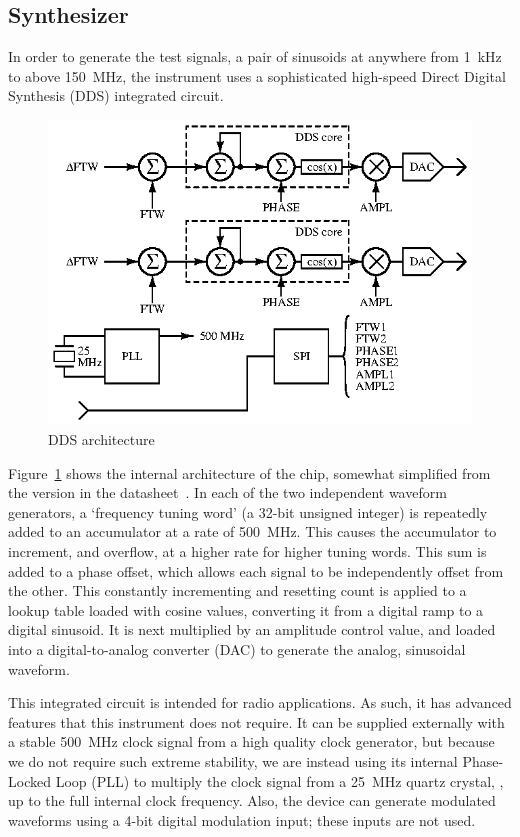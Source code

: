 \subsection{Synthesizer}


In order to generate the test signals, a pair of sinusoids at anywhere from
1~kHz to above 150~MHz, the instrument uses a sophisticated
high-speed Direct Digital Synthesis (DDS) integrated circuit.

\begin{figure}[H]
\centering
\includegraphics{too/dds}
\caption{DDS architecture}
\label{fig:dds}
\end{figure}

Figure~\ref{fig:dds} shows the internal architecture of the chip, somewhat
simplified from the version in the datasheet~\cite{ad9958}. In each of the two
independent waveform generators, a `frequency tuning word' (a 32-bit unsigned
integer) is repeatedly added to an accumulator at a rate of 500~MHz.
This causes the accumulator to increment, and overflow, at a higher rate for
higher tuning words. This sum is added to a phase offset, which allows each
signal to be independently offset from the other. This constantly incrementing
and resetting count is applied to a lookup table loaded with cosine values,
converting it from a digital ramp to a digital sinusoid. It is next multiplied
by an amplitude control value, and loaded into a digital-to-analog converter
(DAC) to generate the analog, sinusoidal waveform.

This integrated circuit is intended for radio applications. As such, it has
advanced features that this instrument does not require. It can be supplied
externally with a stable 500~MHz clock signal from a high quality
clock generator, but because we do not require such extreme stability, we
are instead using its internal Phase-Locked Loop (PLL) to multiply the clock
signal from a 25~MHz quartz crystal, , up to the full
internal clock frequency. Also, the device can generate modulated waveforms
using a 4-bit digital modulation input; these inputs are not used.

